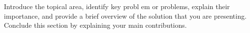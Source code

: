 Introduce the topical area, identify key probl
em or problems,
explain their importance, and provide a brief overview of the solution that you are presenting.
Conclude this section by explaining your main contributions. 

\blindtext
